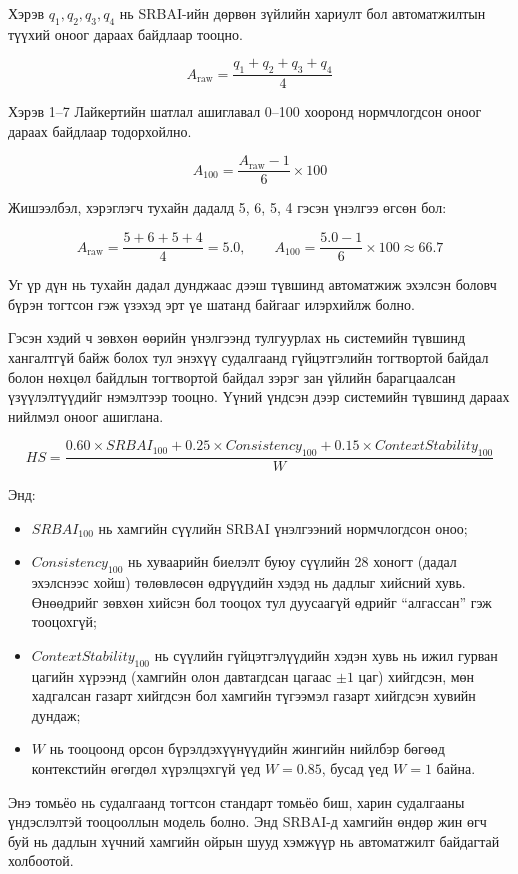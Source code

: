 Хэрэв $q_1, q_2, q_3, q_4$ нь SRBAI-ийн дөрвөн зүйлийн хариулт бол автоматжилтын түүхий оноог дараах байдлаар тооцно.

\[
A_{\text{raw}}=\frac{q_1+q_2+q_3+q_4}{4}
\]

Хэрэв 1--7 Лайкертийн шатлал ашиглавал 0--100 хооронд нормчлогдсон оноог дараах байдлаар тодорхойлно.

\[
A_{100}=\frac{A_{\text{raw}}-1}{6}\times 100
\]

Жишээлбэл, хэрэглэгч тухайн дадалд 5, 6, 5, 4 гэсэн үнэлгээ өгсөн бол:

\[
A_{\text{raw}}=\frac{5+6+5+4}{4}=5.0,\qquad
A_{100}=\frac{5.0-1}{6}\times 100 \approx 66.7
\]

Уг үр дүн нь тухайн дадал дунджаас дээш түвшинд автоматжиж эхэлсэн боловч бүрэн тогтсон гэж үзэхэд эрт үе шатанд байгааг илэрхийлж болно.

Гэсэн хэдий ч зөвхөн өөрийн үнэлгээнд тулгуурлах нь системийн түвшинд хангалтгүй байж болох тул энэхүү судалгаанд гүйцэтгэлийн тогтвортой байдал болон нөхцөл байдлын тогтвортой байдал зэрэг зан үйлийн барагцаалсан үзүүлэлтүүдийг нэмэлтээр тооцно. Үүний үндсэн дээр системийн түвшинд дараах нийлмэл оноог ашиглана.

\[
HS = \frac{0.60\times SRBAI_{100} + 0.25\times Consistency_{100} + 0.15\times ContextStability_{100}}{W}
\]

Энд:

\begin{itemize}
    \item $SRBAI_{100}$ нь хамгийн сүүлийн SRBAI үнэлгээний нормчлогдсон оноо;
    \item $Consistency_{100}$ нь хуваарийн биелэлт буюу сүүлийн 28 хоногт (дадал эхэлснээс хойш) төлөвлөсөн өдрүүдийн хэдэд нь дадлыг хийсний хувь. Өнөөдрийг зөвхөн хийсэн бол тооцох тул дуусаагүй өдрийг ``алгассан'' гэж тооцохгүй;
    \item $ContextStability_{100}$ нь сүүлийн гүйцэтгэлүүдийн хэдэн хувь нь ижил гурван цагийн хүрээнд (хамгийн олон давтагдсан цагаас $\pm 1$ цаг) хийгдсэн, мөн хадгалсан газарт хийгдсэн бол хамгийн түгээмэл газарт хийгдсэн хувийн дундаж;
    \item $W$ нь тооцоонд орсон бүрэлдэхүүнүүдийн жингийн нийлбэр бөгөөд контекстийн өгөгдөл хүрэлцэхгүй үед $W = 0.85$, бусад үед $W = 1$ байна.
\end{itemize}

Энэ томьёо нь судалгаанд тогтсон стандарт томьёо биш, харин судалгааны үндэслэлтэй тооцооллын модель болно. Энд SRBAI-д хамгийн өндөр жин өгч буй нь дадлын хүчний хамгийн ойрын шууд хэмжүүр нь автоматжилт байдагтай холбоотой.

